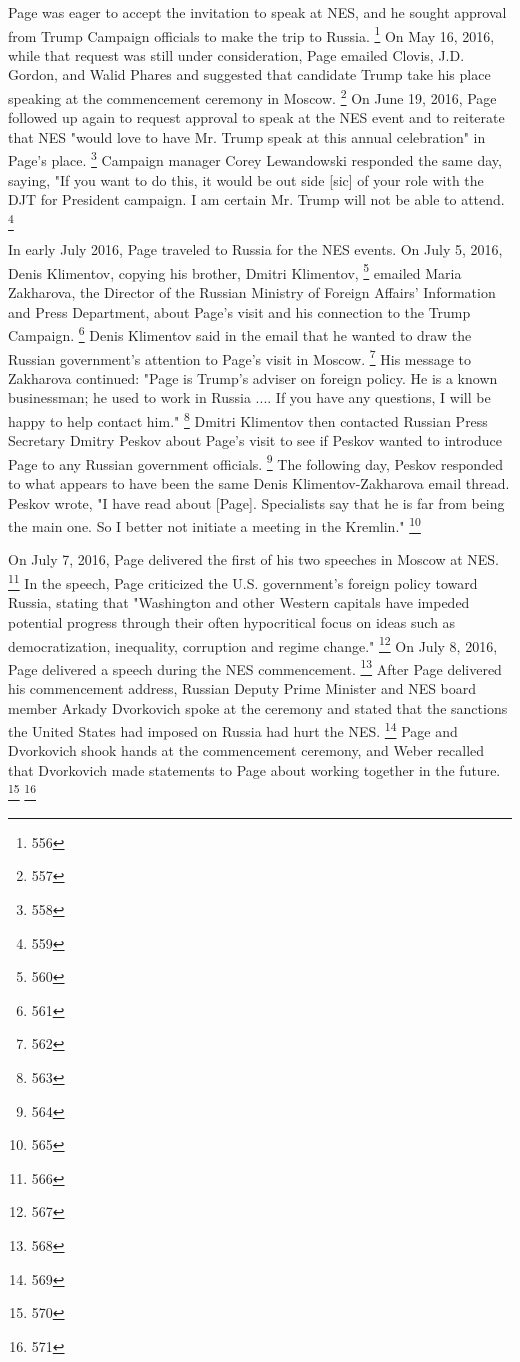 Page was eager to accept the invitation to speak at NES, and he sought approval from Trump Campaign officials to make the trip to Russia.%
\footnote{556}
On May 16, 2016, while that request was still under consideration, Page emailed Clovis, J.D. Gordon, and Walid Phares and suggested that candidate Trump take his place speaking at the commencement ceremony in Moscow.%
\footnote{557}
On June 19, 2016, Page followed up again to request approval to speak at the NES event and to reiterate that NES "would love to have Mr. Trump speak at this annual celebration" in Page's place.%
\footnote{558}
Campaign manager Corey Lewandowski responded the same day, saying, "If you want to do this, it would be out side [sic] of your role with the DJT for President campaign. I am certain Mr. Trump will not be able to attend.%
\footnote{559}

In early July 2016, Page traveled to Russia for the NES events.
On July 5, 2016, Denis Klimentov, copying his brother, Dmitri Klimentov,%
\footnote{560}
emailed Maria Zakharova, the Director of the Russian Ministry of Foreign Affairs' Information and Press Department, about Page's visit and his connection to the Trump Campaign.%
\footnote{561}
Denis Klimentov said in the email that he wanted to draw the Russian government's attention to Page's visit in Moscow.%
\footnote{562}
His message to Zakharova continued: "Page is Trump's adviser on foreign policy.
He is a known businessman; he used to work in Russia ....
If you have any questions, I will be happy to help contact him."%
\footnote{563}
Dmitri Klimentov then contacted Russian Press Secretary Dmitry Peskov about Page's visit to see if Peskov wanted to introduce Page to any Russian government officials.%
\footnote{564}
The following day, Peskov responded to what appears to have been the same Denis Klimentov-Zakharova email thread.
Peskov wrote, "I have read about [Page].
Specialists say that he is far from being the main one.
So I better not initiate a meeting in the Kremlin."%
\footnote{565}

On July 7, 2016, Page delivered the first of his two speeches in Moscow at NES. %
\footnote{566}
In the speech, Page criticized the U.S. government's foreign policy toward Russia, stating that "Washington and other Western capitals have impeded potential progress through their often hypocritical focus on ideas such as democratization, inequality, corruption and regime change."%
\footnote{567}
On July 8, 2016, Page delivered a speech during the NES commencement.%
\footnote{568}
After Page delivered his commencement address, Russian Deputy Prime Minister and NES board member Arkady Dvorkovich spoke at the ceremony and stated that the sanctions the United States had imposed on Russia had hurt the NES.%
\footnote{569}
Page and Dvorkovich shook hands at the commencement ceremony, and Weber recalled that Dvorkovich made statements to Page about working together in the future.%
\footnote{570}
\footnote{571}


